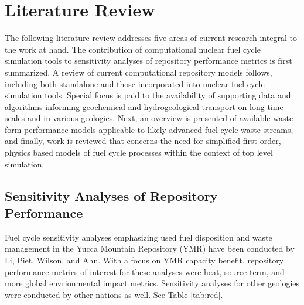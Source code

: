 \chapter{Literature Review}
The following literature review addresses five areas of current research integral to the work at 
hand. The contribution of computational nuclear fuel cycle simulation tools to sensitivity analyses 
of repository performance metrics is first summarized. A review of current computational repository 
models follows, including both standalone and those incorporated into nuclear fuel cycle simulation 
tools. Special focus is paid to the availability of supporting data and algorithms informing 
geochemical and hydrogeological transport on long time scales and in various geologies. Next, an 
overview is presented of available waste form performance models applicable to likely advanced fuel 
cycle waste streams, and finally, work is reviewed that concerns the need for simplified first 
order, physics based models of fuel cycle processes within the context of top level simulation.  
\section{Sensitivity Analyses of Repository Performance} Fuel cycle sensitivity analyses emphasizing 
used fuel disposition and waste management in the Yucca Mountain Repository (YMR) have been 
conducted by Li, Piet, Wilson, and Ahn. With a focus on YMR capacity benefit, repository performance 
metrics of interest for these analyses were heat, source term, and more global envrionmental impact 
metrics. Sensitivity analyses for other geologies were conducted by other nations as well. See Table 
\ref{tab:red}.

